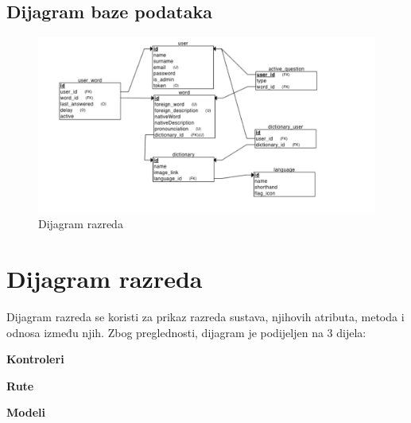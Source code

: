 					
			\subsection{Dijagram baze podataka}
				\begin{figure}[H]
					\includegraphics[scale=0.5]{dijagrami/baza_dijagram.png} 
					\centering
					\caption{Dijagram razreda}
					\label{fig:class_diagram}
				\end{figure}			
			\eject
			
			
		\section{Dijagram razreda}        

			
            Dijagram razreda se koristi za prikaz razreda sustava, njihovih atributa, metoda i odnosa između njih.
            Zbog preglednosti, dijagram je podijeljen na 3 dijela:
            \begin{packed_item}
                \item \textbf{Kontroleri}
                \item \textbf{Rute}
                \item \textbf{Modeli}
            \end{packed_item}
           

